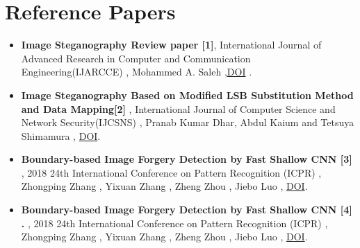 \documentclass{beamer} %
\theoremstyle{definition} %
\begin{document}
\section{Reference Papers}

\begin{itemize}
	\item{\textbf{Image Steganography Review paper [1]}, International Journal of Advanced Research in Computer and Communication Engineering(IJARCCE) , Mohammed A. Saleh ,\href{https://ijarcce.com/wp-content/uploads/2018/10/IJARCCE.2018.7910.pdf} {DOI} .}
\end{itemize}

\begin{itemize}
	\item{\textbf{Image Steganography Based on Modified LSB Substitution Method and Data Mapping[2]} ,   International Journal of Computer Science and Network Security(IJCSNS) , Pranab Kumar Dhar, Abdul Kaium and Tetsuya Shimamura , \href{http://paper.ijcsns.org/07_book/201803/20180321.pdf}{DOI}.}
	\end{itemize}
\begin{itemize}
	\item{\textbf{Boundary-based Image Forgery Detection by Fast Shallow CNN
	[3]} , 2018 24th International Conference on Pattern Recognition (ICPR) , Zhongping Zhang , Yixuan Zhang , Zheng Zhou , Jiebo Luo , \href{http://doi.org/10.1109/ICPR.2018.8545074} {DOI}. }

\end{itemize}

\begin{itemize}
	\item {\textbf{Boundary-based Image Forgery Detection by Fast Shallow CNN [4] .} , 2018 24th International Conference on Pattern Recognition (ICPR) , Zhongping Zhang , Yixuan Zhang , Zheng Zhou , Jiebo Luo , \href{https://doi.org/10.1109/ICPR.2018.8545074}{DOI}.}
\end{itemize}
\end{document}
